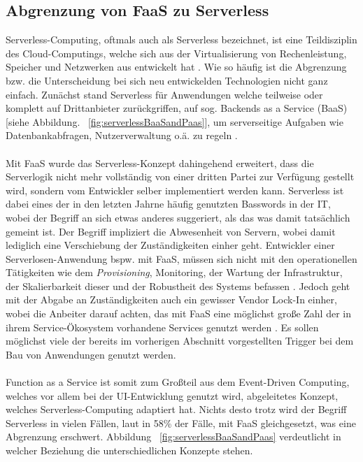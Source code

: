 \documentclass[11pt]{article}
\begin{document}
\subsection{Abgrenzung von FaaS zu Serverless}
Serverless-Computing, oftmals auch als Serverless bezeichnet, ist eine Teildisziplin des Cloud-Computings, welche sich aus der Virtualisierung von Rechenleistung, Speicher und Netzwerken aus entwickelt hat \cite{jackson2018investigation}. Wie so häufig ist die Abgrenzung bzw. die Unterscheidung bei sich neu entwickelden Technologien nicht ganz einfach. Zunächst stand Serverless für Anwendungen welche teilweise oder komplett auf Drittanbieter zurückgriffen, auf sog. Backends as a Service (BaaS) [siehe Abbildung. ~\ref{fig:serverlessBaaSandPaas}], um serverseitige Aufgaben wie Datenbankabfragen, Nutzerverwaltung o.ä. zu regeln \cite{fowler2018serverless}. \\\\
Mit FaaS wurde das Serverless-Konzept dahingehend erweitert, dass die Serverlogik nicht mehr vollständig von einer dritten Partei zur Verfügung gestellt wird, sondern vom Entwickler selber implementiert werden kann. Serverless ist dabei eines der in den letzten Jahrne häufig genutzten Basswords in der IT, wobei der Begriff an sich etwas anderes suggeriert, als das was damit tatsächlich gemeint ist. Der Begriff impliziert die Abwesenheit von Servern, wobei damit lediglich eine Verschiebung der Zuständigkeiten einher geht. Entwickler einer \glqq Serverlosen\grqq{}-Anwendung bspw. mit FaaS, müssen sich nicht mit den operationellen Tätigkeiten wie dem \textit{Provisioning}, Monitoring, der Wartung der Infrastruktur, der Skalierbarkeit dieser und der Robustheit des Systems befassen \cite{baldini2017serverless}. Jedoch geht mit der Abgabe an Zuständigkeiten auch ein gewisser Vendor Lock-In einher, wobei die Anbeiter darauf achten, das mit FaaS eine möglichst große Zahl der in ihrem Service-Ökosystem vorhandene Services genutzt werden \cite{kritikos2018review}. Es sollen möglichst viele der bereits im vorherigen Abschnitt vorgestellten Trigger bei dem Bau von Anwendungen genutzt werden. \\\\
Function as a Service ist somit zum Großteil aus dem Event-Driven Computing, welches vor allem bei der UI-Entwicklung genutzt wird, abgeleitetes Konzept, welches Serverless-Computing adaptiert hat. Nichts desto trotz wird der Begriff Serverless in vielen Fällen, laut \cite{leitner2019mixed} in 58\% der Fälle, mit FaaS gleichgesetzt, was eine Abgrenzung erschwert. Abbildung ~\ref{fig:serverlessBaaSandPaas} verdeutlicht in welcher Beziehung die unterschiedlichen Konzepte stehen. 
\end{document}
